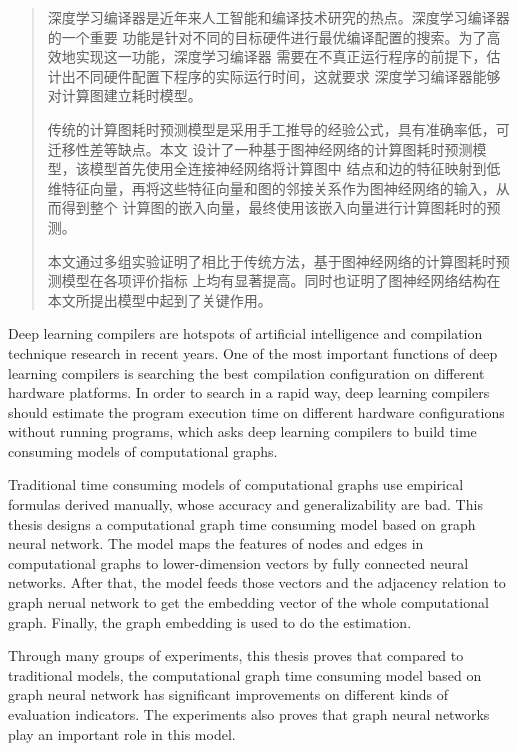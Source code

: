 

\begin{abstract}
  深度学习编译器是近年来人工智能和编译技术研究的热点。深度学习编译器的一个重要
  功能是针对不同的目标硬件进行最优编译配置的搜索。为了高效地实现这一功能，深度学习编译器
  需要在不真正运行程序的前提下，估计出不同硬件配置下程序的实际运行时间，这就要求
  深度学习编译器能够对计算图建立耗时模型。

  传统的计算图耗时预测模型是采用手工推导的经验公式，具有准确率低，可迁移性差等缺点。本文
  设计了一种基于图神经网络的计算图耗时预测模型，该模型首先使用全连接神经网络将计算图中
  结点和边的特征映射到低维特征向量，再将这些特征向量和图的邻接关系作为图神经网络的输入，从而得到整个
  计算图的嵌入向量，最终使用该嵌入向量进行计算图耗时的预测。

  本文通过多组实验证明了相比于传统方法，基于图神经网络的计算图耗时预测模型在各项评价指标
  上均有显著提高。同时也证明了图神经网络结构在本文所提出模型中起到了关键作用。
\end{abstract}

\begin{abstract*}
  Deep learning compilers are hotspots of artificial intelligence and compilation technique research in recent years.
  One of the most important functions of deep learning compilers is searching the best compilation configuration on different hardware platforms.
  In order to search in a rapid way, deep learning compilers should estimate the program execution time on different hardware configurations without running programs, 
  which asks deep learning compilers to build time consuming models of computational graphs.

  Traditional time consuming models of computational graphs use empirical formulas derived manually, 
  whose accuracy and generalizability are bad. This thesis designs a computational graph time consuming model based on graph neural network.
  The model maps the features of nodes and edges in computational graphs to lower-dimension vectors by fully connected neural networks. After that,
  the model feeds those vectors and the adjacency relation to graph nerual network to get the embedding vector of the whole computational graph.
  Finally, the graph embedding is used to do the estimation.

  Through many groups of experiments, this thesis proves that compared to traditional models, the computational graph time consuming model based on graph neural network has significant improvements on different kinds of evaluation indicators.
  The experiments also proves that graph neural networks play an important role in this model.
\end{abstract*}
